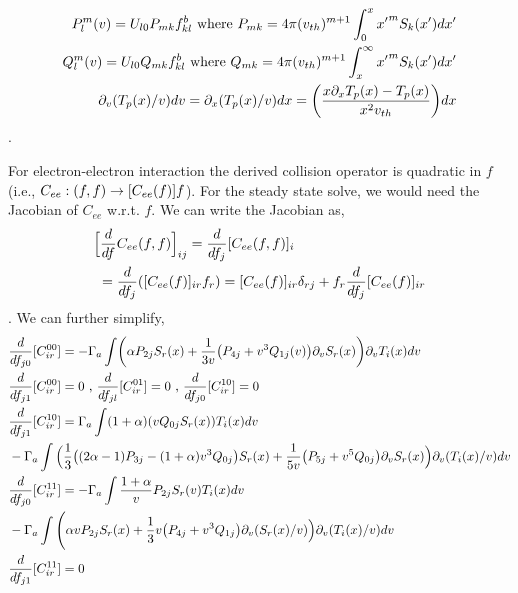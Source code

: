 \documentclass{article}[draft]
\begin{document}
\begin{align*}
	P^{m}_l\of{v} = U_{l0}P_{mk} f^{b}_{kl} \text{ where } P_{mk} = 4\pi (v_{th})^{m+1}\int_{0}^{x} {x^\prime}^m S_k(x^\prime) dx^\prime \\
	Q^{m}_l\of{v} = U_{l0}Q_{mk} f^{b}_{kl} \text{ where } Q_{mk} = 4\pi (v_{th})^{m+1}\int_{x}^{\infty} {x^\prime}^m S_k(x^\prime) dx^\prime \\
	\partial_v \of{ T_p\of{x}/v} dv = \partial_x \of{ T_p\of{x}/v} dx = \of{\frac{x\partial_x T_p\of{x} - T_p\of{x}}{x^2 v_{th}}} dx
\end{align*}. 

For electron-electron interaction the derived collision operator is quadratic in $f$ (i.e., $C_{ee} : (f, f) \rightarrow [C_{ee}\of{f}] f$). For the steady state solve, we would need the Jacobian of $C_{ee}$ w.r.t. $f$. We can write the Jacobian as, 
\begin{align*}
	&\Big[\frac{d }{df} C_{ee}(f,f)\Big]_{ij} = \frac{d }{d f_j} [C_{ee}(f,f)]_i \\
	&\ = \frac{d }{d f_j} \of{[C_{ee}\of{f}]_{ir} f_r} =  [C_{ee}\of{f}]_{ir} \delta_{rj} + f_r \frac{d}{d f_j} [C_{ee}\of{f}]_{ir}
\end{align*}. We can further simplify, 
\begin{align*}
	&\frac{d}{d f_{j0}} [C^{00}_{ir}] = - \Gamma_a \int \of{\alpha P_{2j} S_r\of{x} + \frac{1}{3v}\of{P_{4j} + v^3 Q_{1j}\of{v}} \partial_v S_r\of{x}} \partial_v T_i\of{x} dv \\
	&\frac{d}{d f_{j1}} [C^{00}_{ir}] = 0 \text{ , }
	\frac{d}{d f_{jl}} [C^{01}_{ir}] = 0 \text{ , } \frac{d}{d f_{j0}} [C^{10}_{ir}] =0 \\
	&\frac{d}{d f_{j1}} [C^{10}_{ir}] = \Gamma_a \int (1+\alpha) \of{v Q_{0j} S_r\of{x}} T_i\of{x} dv\\
	&-\Gamma_a \int \Big(\frac{1}{3}\of{(2\alpha -1 ) P_{3j} - (1 + \alpha) v^3 Q_{0j} }S_r\of{x} + \frac{1}{5v}\of{P_{5j} + v^5 Q_{0j}}\partial_v S_r\of{x} \Big) \partial_v \of{T_i\of{x}/v} dv\\
	&\frac{d}{d f_{j0}} [C^{11}_{ir}] = -\Gamma_a \int  \frac{1+\alpha}{v} P_{2j} S_r\of{v} T_i\of{x} dv \\
	&-\Gamma_a \int \Bigg(\alpha v P_{2j} S_r\of{x} + \frac{1}{3} v\of{P_{4j} + v^3 Q_{1j}} \partial_v \of{S_r\of{x}/v}\Big) \partial_v\of{T_i\of{x}/v} dv \\
	&\frac{d}{d f_{j1}} [C^{11}_{ir}] = 0
\end{align*}

\newpage
\end{document}
